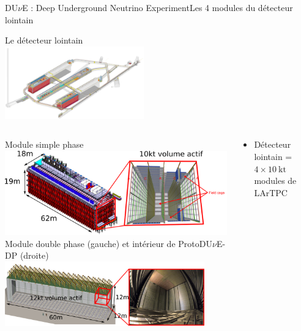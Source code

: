     \begin{frame}{DU$\nu$E : Deep Underground Neutrino Experiment}{Les 4 modules du détecteur lointain}
        \begin{scriptsize}
            \centering Le détecteur lointain\\
            \includegraphics[width=0.45\textwidth]{./pictures/FD.png}\\
            \begin{columns}
                \begin{column}{0.55\textwidth}
                    \centering Module simple phase\\
                    \includegraphics[width=\textwidth]{./pictures/module_SP.png}\\
                    \centering Module double phase (gauche) et intérieur de ProtoDU$\nu$E-DP (droite)\\
                    \includegraphics[width=0.9\textwidth]{./pictures/module_DP.png}
                \end{column}
                \begin{column}{0.45\textwidth}
                    \begin{itemize}
                        \item Détecteur lointain = $4\times\SI{10}{\kilo\tonne}$ modules de LArTPC

\end{itemize}
\end{column}
\end{columns}
\end{scriptsize}
\end{frame}
